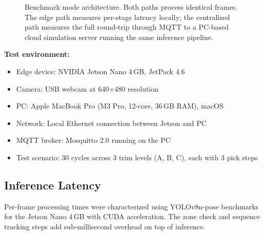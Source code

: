 \documentclass[conference]{IEEEtran}
\begin{document}
\begin{figure}[htbp]
{%
}%
\caption{Benchmark mode architecture. Both paths process identical frames. The edge path measures per-stage latency locally; the centralized path measures the full round-trip through MQTT to a PC-based cloud simulation server running the same inference pipeline.}
\label{fig:benchmark_arch}
\end{figure}

\textbf{Test environment:}
\begin{itemize}
    \item Edge device: NVIDIA Jetson Nano 4\,GB, JetPack 4.6
    \item Camera: USB webcam at 640$\times$480 resolution
    \item PC: Apple MacBook Pro (M3 Pro, 12-core, 36\,GB RAM), macOS
    \item Network: Local Ethernet connection between Jetson and PC
    \item MQTT broker: Mosquitto 2.0 running on the PC
    \item Test scenario: 30 cycles across 3 trim levels (A, B, C), each with 3 pick steps
\end{itemize}

\subsection{Inference Latency}

Per-frame processing times were characterized using YOLOv8n-pose benchmarks for the Jetson Nano 4\,GB with CUDA acceleration. The zone check and sequence tracking steps add sub-millisecond overhead on top of inference.
\end{document}
